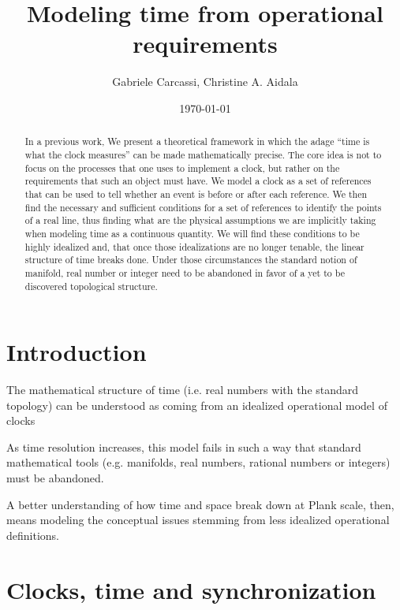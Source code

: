 \documentclass[10pt,twocolumn, nofootinbib]{revtex4-2}
\begin{document}
\title{Modeling time from operational requirements}
\author{Gabriele Carcassi, Christine A. Aidala}

\date{\today}


\begin{abstract}
In a previous work, We present a theoretical framework in which the adage ``time is what the clock measures'' can be made mathematically precise. The core idea is not to focus on the processes that one uses to implement a clock, but rather on the requirements that such an object must have. We model a clock as a set of references that can be used to tell whether an event is before or after each reference. We then find the necessary and sufficient conditions for a set of references to identify the points of a real line, thus finding what are the physical assumptions we are implicitly taking when modeling time as a continuous quantity. We will find these conditions to be highly idealized and, that once those idealizations are no longer tenable, the linear structure of time breaks done. Under those circumstances the standard notion of manifold, real number or integer need to be abandoned in favor of a yet to be discovered topological structure.
\end{abstract}

\maketitle

\section{Introduction}

The mathematical structure of time (i.e. real numbers with the standard topology) can be understood as coming from an idealized operational model of clocks

As time resolution increases, this model fails in such a way that standard mathematical tools (e.g. manifolds, real numbers, rational numbers or integers) must be abandoned.

A better understanding of how time and space break down at Plank scale, then, means modeling the conceptual issues stemming from less idealized operational definitions.


\section{Clocks, time and synchronization}
\end{document}
